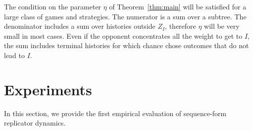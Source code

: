\documentclass{aamas2014}
\newcommand{\PW}{\mbox{PW}}
\newcommand{\todo}[1]{{\color{red}{\bf #1}}}
\begin{document}
The condition on the parameter $\eta$ of Theorem~\ref{thm:main} will be satisfied for a large class of games and strategies. 
The numerator is a sum over a subtree. 
The denominator includes a sum over histories outside $Z_I$, therefore $\eta$ will be very small in most cases. 
Even if the opponent concentrates all the weight to get to $I$, the sum includes terminal histories for which chance 
chose outcomes that do not lead to $I$. 









\section{Experiments}
\label{sec:exp}

 
In this section, we provide the first empirical evaluation of sequence-form replicator dynamics. 
\end{document}
